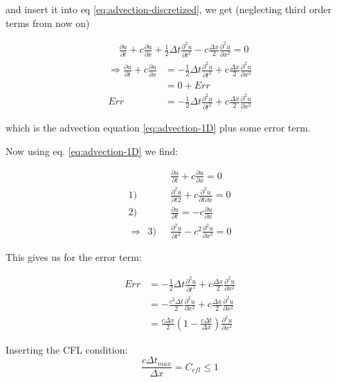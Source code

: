 \begin{itemize}
		and insert it into eq \ref{eq:advection-discretized}, we get (neglecting third order terms from now on)
		
		\begin{align}
			& \frac{\partial u}{\partial t} + c\frac{\partial u}{\partial x} + \frac{1}{2}\Delta t \frac{\partial^2 u }{\partial t^2} - c \frac{\Delta x}{2} \frac{\partial^2 u }{\partial x^2} = 0
		\end{align}
		\begin{align}
			\Rightarrow \frac{\partial u}{\partial t} + c\frac{\partial u}{\partial x} &= 
				-\frac{1}{2}\Delta t\frac{\partial^2 u }{\partial t^2} + c \frac{\Delta x}{2} \frac{\partial^2 u }{\partial x^2} \\
				&= 0 + Err \\
			Err &= -\frac{1}{2}\Delta t\frac{\partial^2 u }{\partial t^2} + c \frac{\Delta x}{2} \frac{\partial^2 u }{\partial x^2}
		\end{align}
		
		which is the advection equation \ref{eq:advection-1D} plus some error term.
		
		Now using eq. \ref{eq:advection-1D} we find:
		
		\begin{align}
    		& \frac{\partial u}{\partial t} + c\frac{\partial u}{\partial x} = 0 \\
    		1) ~~~ & \frac{\partial^2 u}{\partial t2} + c\frac{\partial^2 u}{\partial t\partial x} = 0 \\
    		2) ~~~ & \frac{\partial u}{\partial t} = -c \frac{\partial u}{\partial x} \\
    		\Rightarrow ~~ 3) ~~~ & \frac{\partial^2 u}{\partial t^2} - c^2 \frac{\partial^2 u}{\partial x^2} = 0
		\end{align}
		
		This gives us for the error term:
		
		\begin{align}
			Err &= 
				-\frac{1}{2}\Delta t\frac{\partial^2 u }{\partial t^2} + c \frac{\Delta x}{2} \frac{\partial^2 u }{\partial x^2} \\
				&= -\frac{c^2 \Delta t}{2}\frac{\partial^2 u }{\partial x^2} + c \frac{\Delta x}{2} \frac{\partial^2 u }{\partial x^2} \\
				&= \frac{c\Delta x}{2} \left(1 - \frac{c \Delta t}{\Delta x} \right) \frac{\partial^2 u }{\partial x^2}
		\end{align}
		
		Inserting the CFL condition:
		\begin{equation}
			\frac{c \Delta t_{max}}{\Delta x} = C_{cfl} \leq 1
		\end{equation}
		

\end{itemize}
